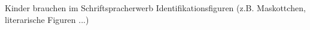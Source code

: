 Kinder brauchen im Schriftspracherwerb Identifikationsfiguren (z.B. Maskottchen, literarische Figuren ...)